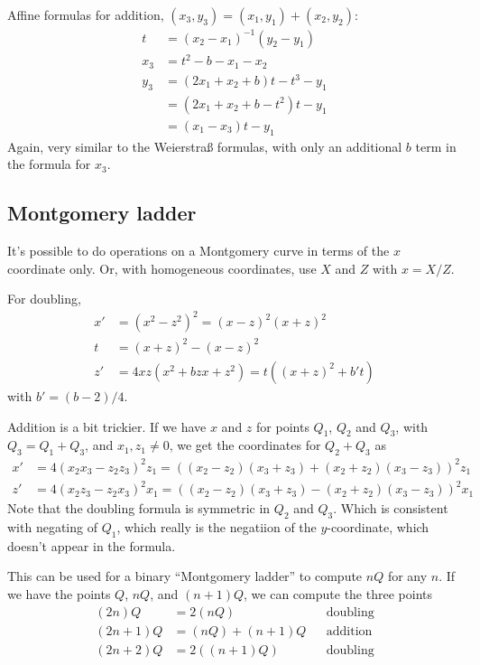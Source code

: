 \documentclass[a4paper]{article}
\begin{document}
Affine formulas for addition, $(x_3, y_3) = (x_1, y_1) + (x_2,
y_2)$:
\begin{align*}
  t &= (x_2 - x_1)^{-1} (y_2 - y_1) \\
  x_3 &= t^2 - b - x_1 - x_2 \\
  y_3 &= (2 x_1 + x_2 + b) t - t^3 - y_1 \\
  &= (2 x_1 + x_2 + b - t^2) t - y_1 \\
  &= (x_1 - x_3) t - y_1
\end{align*}
Again, very similar to the Weierstraß formulas, with only an
additional $b$ term in the formula for $x_3$.

\subsection{Montgomery ladder}

It's possible to do operations on a Montgomery curve in terms of the
$x$ coordinate only. Or, with homogeneous coordinates, use $X$ and $Z$
with $x = X/Z$.

For doubling,
\begin{align*}
  x' &= (x^2 - z^2)^2 = (x-z)^2 (x+z)^2 \\
  t &= (x+z)^2 - (x-z)^2 \\
  z' &= 4 xz (x^2 + bzx + z^2) = t \left((x+z)^2 + b't\right)
\end{align*}
with $b' = (b-2)/4$.

Addition is a bit trickier. If we have $x$ and $z$ for points $Q_1$,
$Q_2$ and $Q_3$, with $Q_3 = Q_1 +  Q_3$, and $x_1, z_1 \neq 0$, we
get the coordinates for $Q_2 + Q_3$ as
\begin{align*}
  x' &= 4 (x_2 x_3 - z_2 z_3)^2 z_1 = \left((x_2 - z_2)(x_3 + z_3) +
    (x_2 + z_2)(x_3 - z_3)\right)^2 z_1 \\
  z' &= 4 (x_2 z_3 - z_2 x_3)^2 x_1 = \left((x_2 - z_2)(x_3 + z_3) -
    (x_2 + z_2)(x_3 - z_3)\right)^2 x_1
\end{align*}
Note that the doubling formula is symmetric in $Q_2$ and $Q_3$. Which
is consistent with negating of $Q_1$, which really is the negatiion of
the $y$-coordinate, which doesn't appear in the formula.

This can be used for a binary ``Montgomery ladder'' to compute $n Q$
for any $n$. If we have the points $Q$, $n Q$, and $(n+1) Q$, we can
compute the three points
\begin{align*}
  (2n) Q &= 2 (nQ) && \text{doubling} \\
  (2n+1) Q &= (nQ) + (n+1)Q && \text{addition} \\
  (2n+2) Q &= 2((n+1) Q) && \text{doubling}
\end{align*}
\end{document}
